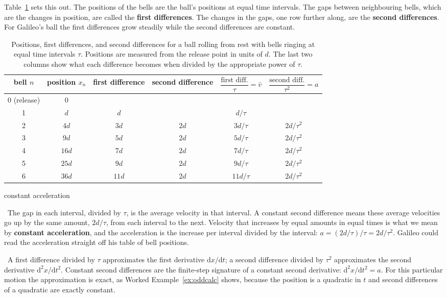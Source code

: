 \documentclass[11pt,twoside,openany]{book}
\newcommand{\dd}{\mathrm{d}}
\newcommand{\viewtag}[3]{\fcolorbox{#2}{#3}{\footnotesize\textbf{\textcolor{#2}{#1}}}}
\newcommand{\elemtag}{\viewtag{Elementary}{elemcol}{elempale}}
\newcommand{\calctag}{\viewtag{Calculus}{calccol}{calcpale}}
\newcommand{\elem}{\par\medskip\noindent\elemtag\ }
\newcommand{\calc}{\par\medskip\noindent\calctag\ }
\begin{document}
Table~\ref{tab:differences} sets this out. The positions of the bells are the ball's positions at equal time intervals. The gaps between neighbouring bells, which are the changes in position, are called the \textbf{first differences}. The changes in the gaps, one row further along, are the \textbf{second differences}. For Galileo's ball the first differences grow steadily while the second differences are constant.

\begin{table}[htb]
\centering
\caption{Positions, first differences, and second differences for a ball rolling from rest with bells ringing at equal time intervals $\tau$. Positions are measured from the release point in units of $d$. The last two columns show what each difference becomes when divided by the appropriate power of $\tau$.}
\label{tab:differences}
\renewcommand{\arraystretch}{1.25}
\small
\begin{tabular}{cccccc}
\toprule
bell $n$ & position $x_n$ & first difference & second difference & $\dfrac{\text{first diff.}}{\tau} = \bar v$ & $\dfrac{\text{second diff.}}{\tau^2} = a$ \\
\midrule
0 (release) & $0$   &       &      &  & \\
1       & $d$   & $d$   &      & $d/\tau$ & \\
2       & $4d$  & $3d$  & $2d$ & $3d/\tau$ & $2d/\tau^2$ \\
3       & $9d$  & $5d$  & $2d$ & $5d/\tau$ & $2d/\tau^2$ \\
4       & $16d$ & $7d$  & $2d$ & $7d/\tau$ & $2d/\tau^2$ \\
5       & $25d$ & $9d$  & $2d$ & $9d/\tau$ & $2d/\tau^2$ \\
6       & $36d$ & $11d$ & $2d$ & $11d/\tau$ & $2d/\tau^2$ \\
\bottomrule
\end{tabular}
\end{table}

\begin{twoviews}{constant acceleration}
\elem The gap in each interval, divided by $\tau$, is the average velocity in that interval. A constant second difference means these average velocities go up by the same amount, $2d/\tau$, from each interval to the next. Velocity that increases by equal amounts in equal times is what we mean by \textbf{constant acceleration}, and the acceleration is the increase per interval divided by the interval: $a = (2d/\tau)/\tau = 2d/\tau^2$. Galileo could read the acceleration straight off his table of bell positions.

\calc A first difference divided by $\tau$ approximates the first derivative $\dd x/\dd t$; a second difference divided by $\tau^2$ approximates the second derivative $\dd^2 x/\dd t^2$. Constant second differences are the finite-step signature of a constant second derivative: $\dd^2 x/\dd t^2 = a$. For this particular motion the approximation is exact, as Worked Example~\ref{ex:oddcalc} shows, because the position is a quadratic in $t$ and second differences of a quadratic are exactly constant.
\end{twoviews}
\end{document}
